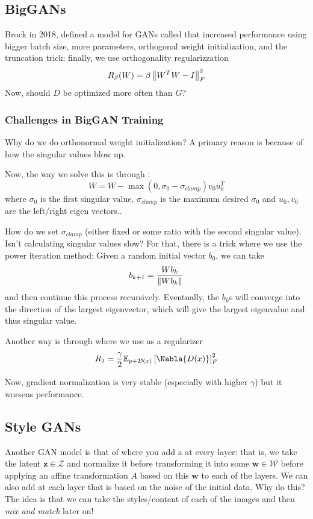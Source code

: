 \documentclass[11pt]{scrartcl}
\begin{document}
\subsection{BigGANs}
Brock in 2018, defined a model for GANs called  that increased performance using bigger batch size, more parameters, orthogonal weight initialization, and the truncation trick: finally, we use orthogonality regularizzation $$R_\beta(W)=\beta\left\lVert W^{T}W-I\right\rVert^2_{F}$$ Now, should $D$ be optimized more often than $G$? 

\subsubsection{Challenges in BigGAN Training}
Why do we do orthonormal weight initialization? A primary reason is because of how the singular values blow up. 

Now, the way we solve this is through : $$W=W-\max(0,\sigma_0-\sigma_{clamp})v_0u_0^{T}$$ where $\sigma_0$ is the first singular value, $\sigma_{clamp}$ is the maximum desired $\sigma_0$ and $u_0,v_0$ are the left/right eigen vectors.. 

How do we set $\sigma_{clamp}$ (either fixed or some ratio with the second singular value). Isn't calculating singular values slow? For that, there is a trick where we use the power iteration method: Given a random initial vector $b_0$, we can take $$b_{k+1}=\frac{Wb_{k}}{\left\lVert Wb_k\right\rVert}$$ and then continue this process recursively. Eventually, the $b_k$s will converge into the direction of the largest eigenvector, which will give the largest eigenvalue and thus singular value. 

Another way is through  where we use as a regularizer $$R_1= \frac{\gamma}{2}\ee_{p+\mathcal{D}(x)}\left[\Nabla{D(x)}\right]^2_{F}$$

Now, gradient normalization is very stable (especially with higher $\gamma$) but it worsens performance. 

\subsection{Style GANs}


Another GAN model is that of  where you add a  at every layer: that is, we take the latent $\textbf{z} \in \mathcal{Z}$ and normalize it before transforming it into some $\textbf{w} \in \mathcal{W}$ before applying an affine transformation $A$ based on this $\textbf{w}$ to each of the layers. We can also add  at each layer that is based on the noise of the initial data. Why do this? The idea is that we can take the styles/content of each of the images and then \textit{mix and match} later on!
\end{document}
